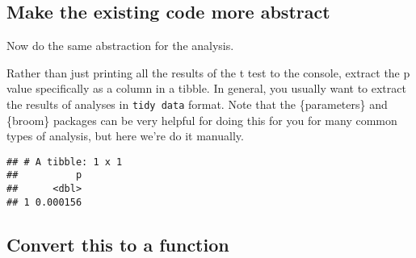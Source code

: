 \documentclass[
]{article}
\newenvironment{Shaded}{\begin{snugshade}}{\end{snugshade}}
\newcommand{\AttributeTok}[1]{\textcolor[rgb]{0.13,0.29,0.53}{#1}}
\newcommand{\ConstantTok}[1]{\textcolor[rgb]{0.56,0.35,0.01}{#1}}
\newcommand{\FunctionTok}[1]{\textcolor[rgb]{0.13,0.29,0.53}{\textbf{#1}}}
\newcommand{\NormalTok}[1]{#1}
\newcommand{\OtherTok}[1]{\textcolor[rgb]{0.56,0.35,0.01}{#1}}
\newcommand{\SpecialCharTok}[1]{\textcolor[rgb]{0.81,0.36,0.00}{\textbf{#1}}}
\newcommand{\StringTok}[1]{\textcolor[rgb]{0.31,0.60,0.02}{#1}}
\begin{document}
\hypertarget{make-the-existing-code-more-abstract-1}{%
\subsection{Make the existing code more
abstract}\label{make-the-existing-code-more-abstract-1}}

Now do the same abstraction for the analysis.

Rather than just printing all the results of the t test to the console,
extract the p value specifically as a column in a tibble. In general,
you usually want to extract the results of analyses in
\texttt{tidy\ data} format. Note that the \{parameters\} and \{broom\}
packages can be very helpful for doing this for you for many common
types of analysis, but here we're do it manually.

\begin{Shaded}
\end{Shaded}

\begin{verbatim}
## # A tibble: 1 x 1
##          p
##      <dbl>
## 1 0.000156
\end{verbatim}

\hypertarget{convert-this-to-a-function-1}{%
\subsection{Convert this to a
function}\label{convert-this-to-a-function-1}}
\end{document}
